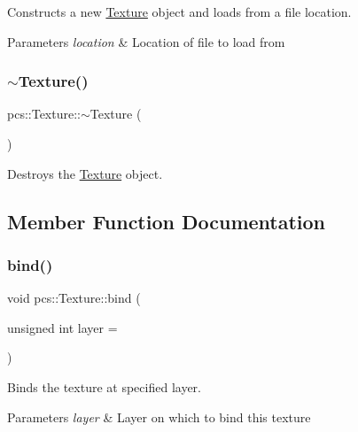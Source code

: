 Constructs a new \hyperlink{classpcs_1_1Texture}{Texture} object and loads from a file location. 


\begin{DoxyParams}{Parameters}
{\em location} & Location of file to load from \\
\hline
\end{DoxyParams}
\mbox{\label{classpcs_1_1Texture_a2267bb7d920e784a1915ae14e5b5916b}} 
\subsubsection{\texorpdfstring{$\sim$\+Texture()}{~Texture()}}
{\footnotesize\ttfamily pcs\+::\+Texture\+::$\sim$\+Texture (\begin{DoxyParamCaption}{ }\end{DoxyParamCaption})}



Destroys the \hyperlink{classpcs_1_1Texture}{Texture} object. 



\subsection{Member Function Documentation}
\mbox{\label{classpcs_1_1Texture_a25574cca4b0d13916950f708acc3e1c9}} 
\subsubsection{\texorpdfstring{bind()}{bind()}}
{\footnotesize\ttfamily void pcs\+::\+Texture\+::bind (\begin{DoxyParamCaption}\item[{unsigned int}]{layer = {} }\end{DoxyParamCaption})}



Binds the texture at specified layer. 


\begin{DoxyParams}{Parameters}
{\em layer} & Layer on which to bind this texture \\
\hline
\end{DoxyParams}
\mbox{\label{classpcs_1_1Texture_aad31d75ae69be153300bd87e244afa54}} 
